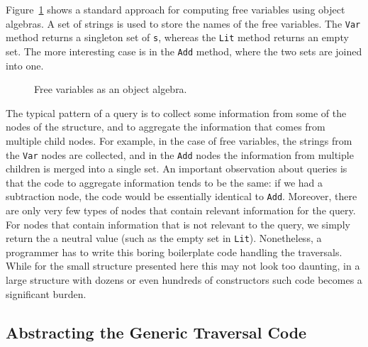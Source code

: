 Figure~\ref{freevars_without_monoid} shows a
standard approach for computing free variables using object algebras.
A set of strings is used to store the names of the free variables. The
\lstinline{Var} method returns a singleton set of \lstinline{s},
whereas the \lstinline{Lit} method returns an empty set. The
more interesting case is in the \lstinline{Add} method, where the two
sets are joined into one.

\begin{figure}[tb]
\vspace{-.1in}
\caption{Free variables as an object algebra.}
\label{freevars_without_monoid}
\end{figure}
\begin{comment}
\bruno{put code in a figure, add a caption and refer
  to the figure in the text.}
\end{comment}

The typical pattern of a query is to collect some information from
some of the nodes of the structure, and to aggregate the information
that comes from multiple child nodes. For example, in the case of free
variables, the strings from the \lstinline{Var} nodes are collected,
and in the \lstinline{Add} nodes the information from multiple
children is merged into a single set. An important observation about
queries is that the code to aggregate information tends to be the
same: if we had a subtraction node, the code would be essentially
identical to \lstinline{Add}. Moreover, there are only very few types
of nodes that contain relevant information for the query. For nodes
that contain information that is not relevant to the query, we simply
return the a neutral value (such as the empty set in \lstinline{Lit}).
Nonetheless, a programmer has to write this boring boilerplate code
handling the traversals.  While for the small structure presented here
this may not look too daunting, in a large structure with dozens or
even hundreds of constructors such code becomes a significant burden.


\subsection{Abstracting the Generic Traversal Code}\label{subsec:genericquery}

